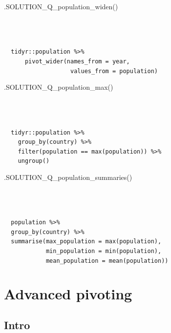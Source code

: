 \documentclass[
  letterpaper,
  DIV=11,
  numbers=noendperiod]{scrreprt}
\newenvironment{Shaded}{\begin{snugshade}}{\end{snugshade}}
\newcommand{\FunctionTok}[1]{\textcolor[rgb]{0.28,0.35,0.67}{#1}}
\newcommand{\NormalTok}[1]{\textcolor[rgb]{0.00,0.23,0.31}{#1}}
\begin{document}
\begin{Shaded}
\begin{Highlighting}[]
\FunctionTok{.SOLUTION\_Q\_population\_widen}\NormalTok{()}
\end{Highlighting}
\end{Shaded}

\begin{verbatim}


  
  tidyr::population %>% 
      pivot_wider(names_from = year,
                   values_from = population)
\end{verbatim}

\begin{Shaded}
\begin{Highlighting}[]
\FunctionTok{.SOLUTION\_Q\_population\_max}\NormalTok{()}
\end{Highlighting}
\end{Shaded}

\begin{verbatim}


  
  tidyr::population %>% 
    group_by(country) %>% 
    filter(population == max(population)) %>% 
    ungroup()
\end{verbatim}

\begin{Shaded}
\begin{Highlighting}[]
\FunctionTok{.SOLUTION\_Q\_population\_summaries}\NormalTok{()}
\end{Highlighting}
\end{Shaded}

\begin{verbatim}


  
  population %>% 
  group_by(country) %>% 
  summarise(max_population = max(population), 
            min_population = min(population), 
            mean_population = mean(population))
\end{verbatim}


\hypertarget{advanced-pivoting}{%
\chapter{Advanced pivoting}\label{advanced-pivoting}}

\hypertarget{intro-3}{%
\section{Intro}\label{intro-3}}
\end{document}
